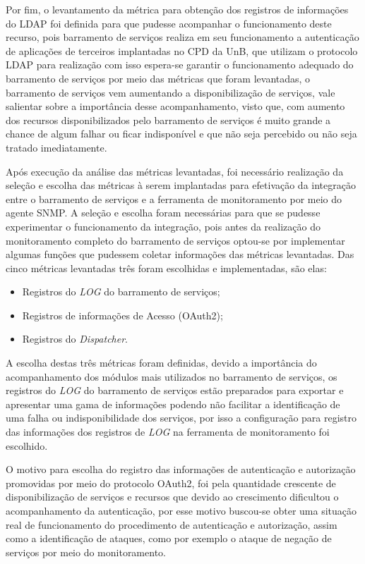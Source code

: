Por fim, o levantamento da métrica para obtenção dos registros de informações do LDAP foi definida para que pudesse acompanhar o funcionamento deste recurso, pois barramento de serviços realiza em seu funcionamento a autenticação de aplicações de terceiros implantadas no CPD da UnB, que utilizam o protocolo LDAP para realização com isso espera-se garantir o funcionamento adequado do barramento de serviços por meio das métricas que foram levantadas, o barramento de serviços vem aumentando a disponibilização de serviços, vale salientar sobre a importância desse acompanhamento, visto que, com aumento dos recursos disponibilizados pelo barramento de serviços é muito grande a chance de algum falhar ou ficar indisponível e que não seja percebido ou não seja tratado imediatamente.  

Após execução da análise das métricas levantadas, foi necessário realização da seleção e escolha das métricas à serem implantadas para efetivação da integração entre o barramento de serviços e a ferramenta de monitoramento por meio do agente \acrshort{SNMP}. A seleção e escolha foram necessárias para que se pudesse experimentar o funcionamento da integração, pois antes da realização do monitoramento completo do barramento de serviços optou-se por implementar algumas funções que pudessem coletar informações das métricas levantadas. Das cinco métricas levantadas três foram escolhidas e implementadas, são elas: 

\begin{itemize}
    \item Registros do \textit{LOG} do barramento de serviços;
    \item Registros de informações de Acesso (OAuth2);
    \item Registros do \textit{Dispatcher}.
\end{itemize}

A escolha destas três métricas foram definidas, devido a importância do acompanhamento dos módulos mais utilizados no barramento de serviços, os registros do \textit{LOG} do barramento de serviços estão preparados para exportar e apresentar uma gama de informações podendo não facilitar a identificação de uma falha ou indisponibilidade dos serviços, por isso a configuração para registro das informações dos registros de \textit{LOG} na ferramenta de monitoramento foi escolhido. 

O motivo para escolha do registro das informações de autenticação e autorização promovidas por meio do protocolo OAuth2, foi pela quantidade crescente de disponibilização de serviços e recursos que devido ao crescimento dificultou o acompanhamento da autenticação, por esse motivo buscou-se obter uma situação real de funcionamento do procedimento de autenticação e autorização, assim como a identificação de ataques, como por exemplo o ataque de negação de serviços por meio do monitoramento. 

